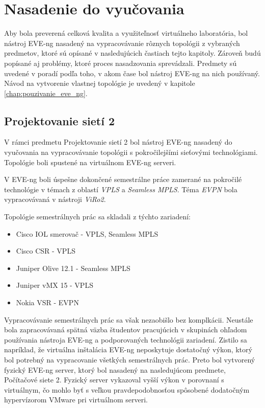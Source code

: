 \chapter{Nasadenie do vyučovania}
\label{chap:nasadenie_do_vyucovania}

Aby bola preverená celková kvalita a využiteľnosť virtuálneho laboratória, bol nástroj EVE-ng nasadený na vypracovávanie rôznych topológii z vybraných predmetov, ktoré sú opísané v nasledujúcich častiach tejto kapitoly. Zároveň budú popísané aj problémy, ktoré proces nasadzovania sprevádzali. Predmety sú uvedené v poradí podľa toho, v akom čase bol nástroj EVE-ng na nich používaný. Návod na vytvorenie vlastnej topológie je uvedený v kapitole \ref{chap:pouzivanie_eve_ng}.





\section{Projektovanie sietí 2}

V rámci predmetu Projektovanie sietí 2 bol nástroj EVE-ng nasadený do vyučovania na vypracovávanie topológii s pokročilejšími sieťovými technológiami. Topológie boli spustené na virtuálnom EVE-ng serveri.

V EVE-ng boli úspešne dokončené semestrálne práce zamerané na pokročilé technológie v témach z oblastí \emph{VPLS} a \emph{Seamless MPLS}. Téma \emph{EVPN} bola vypracovávaná v nástroji \emph{ViRo2}.

Topológie semestrálnych prác sa skladali z týchto zariadení:

\begin{itemize}[noitemsep]
    \item Cisco IOL smerovač - VPLS, Seamless MPLS
    \item Cisco CSR - VPLS
    \item Juniper Olive 12.1 - Seamless MPLS
    \item Juniper vMX 15 - VPLS
    \item Nokia VSR - EVPN
\end{itemize}

Vypracovávanie semestrálnych prác sa však nezaobišlo bez komplkácii. Neustále bola zapracovávaná spätná väzba študentov pracujúcich v skupinách ohľadom používania nástroja EVE-ng a podporovaných technológii zariadení. Zistilo sa napríklad, že virtuálna inštalácia EVE-ng neposkytuje dostatočný výkon, ktorý bol potrebný na vypracovanie všetkých semestrálnych prác. Preto bol vytvorený fyzický EVE-ng server, ktorý bol nasadený na nasledujúcom predmete, Počítačové siete 2. Fyzický server vykazoval vyšší výkon v porovnaní s virtuálnym, čo mohlo byť s veľkou pravdepodobnosťou spôsobené dodatočným hypervízorom VMware pri virtuálnom serveri.





